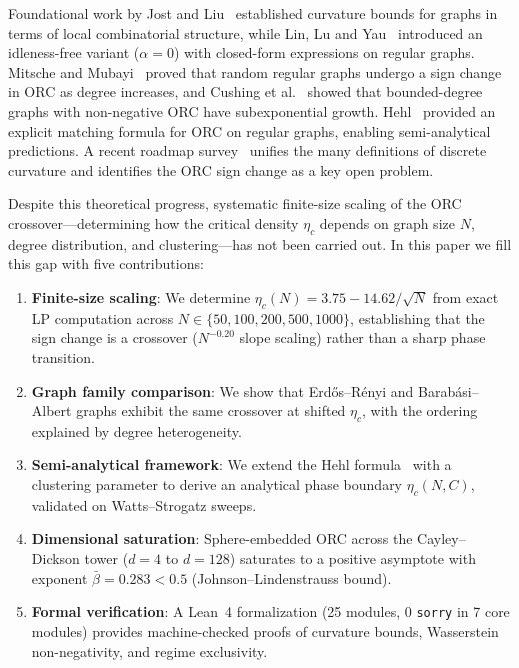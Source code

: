 \documentclass[11pt,a4paper]{article}
\newcommand{\etac}{\eta_c}
\begin{document}
Foundational work by Jost and Liu~\cite{jost2014ollivier} established curvature bounds for graphs in terms of local combinatorial structure, while Lin, Lu and Yau~\cite{lin2011ricci} introduced an idleness-free variant ($\alpha = 0$) with closed-form expressions on regular graphs. Mitsche and Mubayi~\cite{mitsche2024curvature} proved that random regular graphs undergo a sign change in ORC as degree increases, and Cushing et al.~\cite{bounded2025orc} showed that bounded-degree graphs with non-negative ORC have subexponential growth. Hehl~\cite{hehl2024curvature} provided an explicit matching formula for ORC on regular graphs, enabling semi-analytical predictions. A recent roadmap survey~\cite{samal2025roadmap} unifies the many definitions of discrete curvature and identifies the ORC sign change as a key open problem.

Despite this theoretical progress, systematic finite-size scaling of the ORC crossover---determining how the critical density $\etac$ depends on graph size $N$, degree distribution, and clustering---has not been carried out. In this paper we fill this gap with five contributions:
\begin{enumerate}
    \item \textbf{Finite-size scaling}: We determine $\etac(N) = 3.75 - 14.62/\sqrt{N}$ from exact LP computation across $N \in \{50, 100, 200, 500, 1000\}$, establishing that the sign change is a crossover ($N^{-0.20}$ slope scaling) rather than a sharp phase transition.
    \item \textbf{Graph family comparison}: We show that Erd\H{o}s--R\'enyi and Barab\'asi--Albert graphs exhibit the same crossover at shifted $\etac$, with the ordering explained by degree heterogeneity.
    \item \textbf{Semi-analytical framework}: We extend the Hehl formula~\cite{hehl2024curvature} with a clustering parameter to derive an analytical phase boundary $\etac(N, C)$, validated on Watts--Strogatz sweeps.
    \item \textbf{Dimensional saturation}: Sphere-embedded ORC across the Cayley--Dickson tower ($d = 4$ to $d = 128$) saturates to a positive asymptote with exponent $\bar{\beta} = 0.283 < 0.5$ (Johnson--Lindenstrauss bound).
    \item \textbf{Formal verification}: A Lean~4 formalization (25 modules, 0 \texttt{sorry} in 7 core modules) provides machine-checked proofs of curvature bounds, Wasserstein non-negativity, and regime exclusivity.
\end{enumerate}
\end{document}
